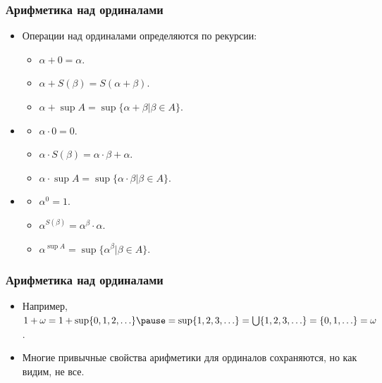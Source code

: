 \documentclass[10pt]{beamer}
\begin{document}
\begin{frame}
    \frametitle{Арифметика над ординалами}
    \begin{itemize}
        \item Операции над ординалами определяются по рекурсии:
        \begin{itemize}
            \item $\alpha + 0 = \alpha$.
            \item $\alpha + S(\beta) = S(\alpha + \beta)$.
            \item $\alpha + \sup A = \sup \{\alpha + \beta | \beta \in A\}$.
        \end{itemize}
        \item
        \begin{itemize}
            \item $\alpha \cdot 0 = 0$.
            \item $\alpha \cdot S(\beta) = \alpha \cdot \beta + \alpha$.
            \item $\alpha \cdot \sup A = \sup \{\alpha \cdot \beta | \beta \in A\}$.
        \end{itemize}
        \item
        \begin{itemize}
            \item $\alpha^0 = 1$.
            \item $\alpha^{S(\beta)} = \alpha^\beta \cdot \alpha$.
            \item $\alpha^{\sup A} = \sup \{\alpha^\beta | \beta \in A\}$.
        \end{itemize}
    \end{itemize}
\end{frame}

\begin{frame}
    \frametitle{Арифметика над ординалами}
    \begin{itemize}
        \item Например, $1 + \omega = 1 + \sup \{0, 1, 2, \ldots\} \pause = \sup \{1, 2, 3, \ldots\} = \bigcup \{1, 2, 3, \ldots\} = \{0, 1, \ldots\} = \omega$.
        \item Многие привычные свойства арифметики для ординалов сохраняются, но как видим, не все.
    \end{itemize}
\end{frame}
\end{document}
